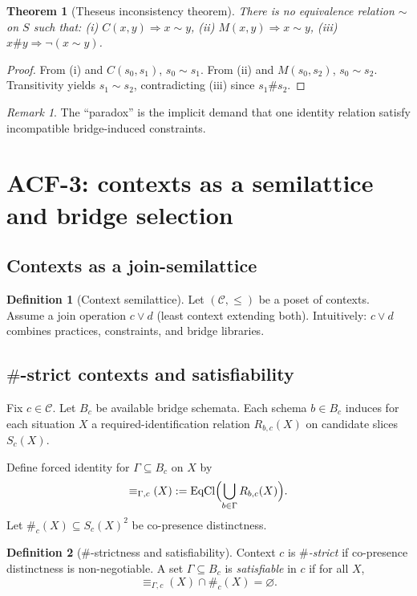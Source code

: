 \documentclass[11pt]{article}
\theoremstyle{definition}
\newtheorem{definition}{Definition}[section]
\theoremstyle{plain}
\newtheorem{theorem}{Theorem}[section]
\theoremstyle{remark}
\newtheorem{remark}{Remark}[section]
\newcommand{\EqCl}{\mathrm{EqCl}}
\begin{document}
\begin{theorem}[Theseus inconsistency theorem]\label{thm:theseus}
There is no equivalence relation $\sim$ on $S$ such that:
(i) $C(x,y)\Rightarrow x\sim y$,
(ii) $M(x,y)\Rightarrow x\sim y$,
(iii) $x\# y\Rightarrow \neg(x\sim y)$.
\end{theorem}

\begin{proof}
From (i) and $C(s_0,s_1)$, $s_0\sim s_1$.
From (ii) and $M(s_0,s_2)$, $s_0\sim s_2$.
Transitivity yields $s_1\sim s_2$, contradicting (iii) since $s_1\# s_2$.
\end{proof}

\begin{remark}
The ``paradox'' is the implicit demand that one identity relation satisfy incompatible bridge-induced constraints.
\end{remark}

\section{ACF-3: contexts as a semilattice and bridge selection}

\subsection{Contexts as a join-semilattice}
\begin{definition}[Context semilattice]
Let $(\mathcal C,\le)$ be a poset of contexts. Assume a join operation $c\vee d$ (least context extending both). Intuitively: $c\vee d$ combines practices, constraints, and bridge libraries.
\end{definition}

\subsection{$\#$-strict contexts and satisfiability}
Fix $c\in\mathcal C$.
Let $B_c$ be available bridge schemata. Each schema $b\in B_c$ induces for each situation $X$ a required-identification relation $R_{b,c}(X)$ on candidate slices $S_c(X)$.

Define forced identity for $\Gamma\subseteq B_c$ on $X$ by
\[
\equiv_{\Gamma,c}(X):=\EqCl\Bigl(\bigcup_{b\in\Gamma} R_{b,c}(X)\Bigr).
\]
Let $\#_c(X)\subseteq S_c(X)^2$ be co-presence distinctness.

\begin{definition}[$\#$-strictness and satisfiability]
Context $c$ is \emph{$\#$-strict} if co-presence distinctness is non-negotiable.
A set $\Gamma\subseteq B_c$ is \emph{satisfiable} in $c$ if for all $X$,
\[
\equiv_{\Gamma,c}(X)\cap \#_c(X)=\varnothing.
\]
\end{definition}
\end{document}
